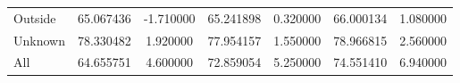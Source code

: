 \begin{table}[!ht]
\begin{tabular}{lSSSSSS@{}}
        \tabindent Outside          & 65.067436                                      & -1.710000                                   & 65.241898                                     & 0.320000  & 66.000134    & 1.080000  \\
        \tabindent Unknown          & 78.330482                                      & 1.920000                                    & 77.954157                                     & 1.550000  & 78.966815    & 2.560000  \\
        \cmidrule(rl){1-7}
        All                         & 64.655751                                      & 4.600000                                    & 72.859054                                     & 5.250000  & 74.551410    & 6.940000  \\
        \bottomrule
    \end{tabular}
\end{table}

\restoregeometry

